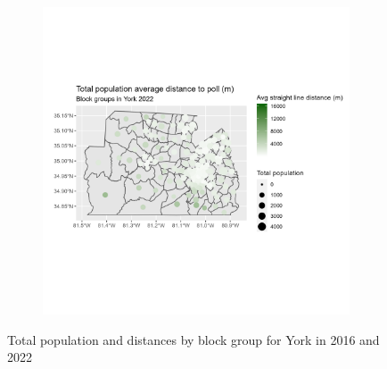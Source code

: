 \documentclass[11pt]{article}
\theoremstyle{remark}
\theoremstyle{definition}
\begin{document}
\begin{figure}
\begin{subfigure}{.5\textwidth}
		\includegraphics[width=\linewidth]{result_analysis/York_County_SC_original_configs/population_pop_and_dist_York_config_original_2022_polls.png}
		\label{sfig:York_2022_bg_dist}
	\end{subfigure}
	\caption{Total population and distances by block group for York in 2016 and 2022}
	\label{fig:York distance Total population maps}
\end{figure}
\end{document}
